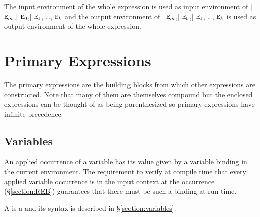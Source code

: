 \ENVIRONMENTS

The input environment of the whole expression is used as input environment
of [[${\tt{\sl E}}_m$,] ${\tt{\sl E}}_0$,] ${\tt{\sl E}}_1$, \ldots, ${\tt{\sl E}}_k$ and the output
environment of
[[${\tt{\sl E}}_m$,] ${\tt{\sl E}}_0$,] ${\tt{\sl E}}_1$, \ldots, ${\tt{\sl E}}_k$
is used as output environment of the whole expression.

\section{Primary Expressions}

\label{section:primary-exprs}
The primary expressions are the building blocks from which other
expressions are constructed.  Note that many of them are themselves
compound but the enclosed expressions can be thought of as being
parenthesized so primary expressions have infinite precedence.

\begin{rules}
       { \OR
         \OR
         \OR
         \OR
         \OR
         \OR
        \ifStd{} \OR
         \OR\fi
        \ifStd{} \OR\fi
         \OR
         \OR
         \OR
        \ifStd{} \OR\fi
         \OR
        \ifOld{} \OR\fi
        }
\end{rules}

\subsection{Variables}

\label{section:variables-eval}

An applied occurrence of a variable
has its value given by a variable
binding in the current environment.
The requirement to verify at compile time
that every applied variable occurrence is in the input context
at the occurrence (\S\ref{section:REB})
guarantees that there must be such a binding at run time.

\SYNTAX

A  is a  and its syntax is described in \S\ref{section:variables}.


